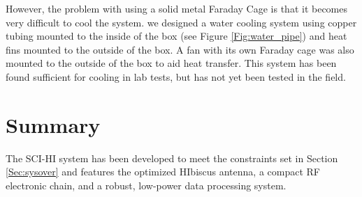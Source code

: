 However, the problem with using a solid metal Faraday Cage is that it becomes very difficult to cool the system. we designed a water cooling system using copper tubing mounted to the inside of the box (see Figure \ref{Fig:water_pipe}) and heat fins mounted to the outside of the box. A fan with its own Faraday cage was also mounted to the outside of the box to aid heat transfer. This system has been found sufficient for cooling in lab tests, but has not yet been tested in the field. 

\section{Summary}

The SCI-HI system has been developed to meet the constraints set in Section \ref{Sec:sysover} and features the optimized HIbiscus antenna, a compact RF electronic chain, and a robust, low-power data processing system. 
